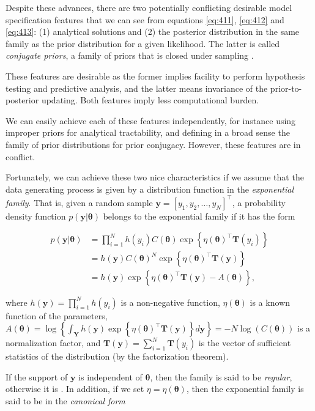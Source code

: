 Despite these advances, there are two potentially conflicting desirable model specification features that we can see from equations \ref{eq:411}, \ref{eq:412} and \ref{eq:413}: (1) analytical solutions and (2) the posterior distribution in the same family as the prior distribution for a given likelihood. The latter is called \textit{conjugate priors}, a family of priors that is closed under sampling \cite{schlaifer1961applied}.

These features are desirable as the former implies facility to perform hypothesis testing and predictive analysis, and the latter means invariance of the prior-to-posterior updating. Both features imply less computational burden.

We can easily achieve each of these features independently, for instance using improper priors for analytical tractability, and defining in a broad sense the family of prior distributions for prior conjugacy. However, these features are in conflict. 

Fortunately, we can achieve these two nice characteristics if we assume that the data generating process is given by a distribution function in the \textit{exponential family}. That is, given a random sample $\mathbf{y}=[y_1,y_2,\dots,y_N]^{\top}$, a probability density function $p(\mathbf{y}|\bm{\theta})$ belongs to the exponential family if it has the form

\begin{align}
	p(\mathbf{y}|\bm{\theta})&=\prod_{i=1}^N h(y_i) C(\bm{\theta}) \exp\left\{\eta(\bm{\theta})^{\top}\mathbf{T}(y_i)\right\}\label{eq:414}\\ 
	&=h(\mathbf{y}) C(\bm{\theta})^N\exp\left\{\eta(\bm{\theta})^{\top}\mathbf{T}(\mathbf{y})\right\}\nonumber \\
	&=h(\mathbf{y})\exp\left\{\eta(\bm{\theta})^{\top}\mathbf{T}(\mathbf{y})-A(\bm{\theta})\right\}\nonumber,
\end{align}

where $h(\mathbf{y})=\prod_{i=1}^N h(y_i)$ is a non-negative function, $\eta(\bm{\theta})$ is a known function of the parameters, $A(\bm{\theta})=\log\left\{\int_{\mathbf{Y}}h(\mathbf{y})\exp\left\{\eta(\bm{\theta})^{\top}\mathbf{T}(\mathbf{y})\right\}d\mathbf{y}\right\}=-N\log(C(\bm{\theta}))$ is a normalization factor, and $\mathbf{T}(\mathbf{y})=\sum_{i=1}^N\mathbf{T}(y_i)$ is the vector of sufficient statistics of the distribution (by the factorization theorem).  

If the support of $\mathbf{y}$ is independent of $\bm{\theta}$, then the family is said to be \textit{regular}, otherwise it is . In addition, if we set $\eta=\eta(\bm{\theta})$, then the exponential family is said to be in the \textit{canonical form} 

